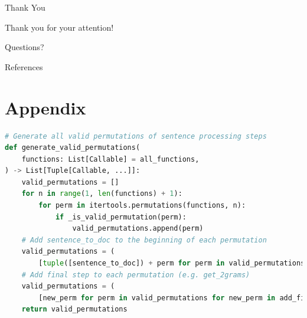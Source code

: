 \documentclass{beamer}
\begin{document}
\begin{frame}{Thank You}
    \begin{center}
        \vspace{2em}
        \Large Thank you for your attention!
        \vspace{2em}
        
        Questions?
    \end{center}
\end{frame}


\begin{frame}{References}
    
\end{frame}

\section{Appendix}
\begin{frame}[fragile]{}
    \begin{lstlisting}[language=Python]
# Generate all valid permutations of sentence processing steps
def generate_valid_permutations(
    functions: List[Callable] = all_functions,
) -> List[Tuple[Callable, ...]]:
    valid_permutations = []
    for n in range(1, len(functions) + 1):
        for perm in itertools.permutations(functions, n):
            if _is_valid_permutation(perm):
                valid_permutations.append(perm)
    # Add sentence_to_doc to the beginning of each permutation
    valid_permutations = (
        [tuple([sentence_to_doc]) + perm for perm in valid_permutations])
    # Add final step to each permutation (e.g. get_2grams)
    valid_permutations = (
        [new_perm for perm in valid_permutations for new_perm in add_final_step(perm)])
    return valid_permutations

    \end{lstlisting}
\end{frame}
\end{document}
